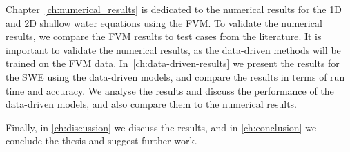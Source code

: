 Chapter~\ref{ch:numerical_results} is dedicated to the numerical results for the 1D and 2D shallow water equations using the FVM.
To validate the numerical results, we compare the FVM results to test cases from the literature.
It is important to validate the numerical results, as the data-driven methods will be trained on the FVM data.
In~\autoref{ch:data-driven-results} we present the results for the SWE using the data-driven models, and compare the results in terms of run time and accuracy. 
We analyse the results and discuss the performance of the data-driven models, and also compare them to the numerical results.

Finally, in \autoref{ch:discussion} we discuss the results, and in \autoref{ch:conclusion} we conclude the thesis and suggest further work.


